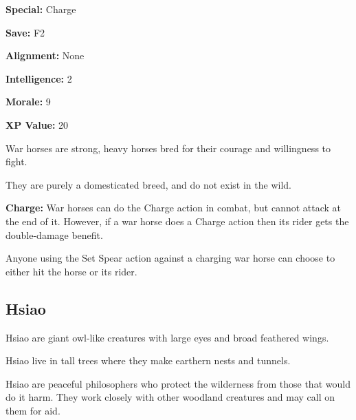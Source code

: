 \begin{multicols*}{2}
{\textbf{Special:} Charge

\textbf{Save:} F2

\textbf{Alignment:} None

\textbf{Intelligence:} 2

\textbf{Morale:} 9

\textbf{XP Value:} 20}

War horses are strong, heavy horses bred for their courage and willingness to fight.

They are purely a domesticated breed, and do not exist in the wild.

\textbf{Charge:} War horses can do the Charge action in combat, but cannot attack at the end of it. However, if a war horse does a Charge action then its rider gets the double-damage benefit.

Anyone using the Set Spear action against a charging war horse can choose to either hit the horse or its rider.

\subsection{Hsiao}

Hsiao are giant owl-like creatures with large eyes and broad feathered wings.

Hsiao live in tall trees where they make earthern nests and tunnels.

Hsiao are peaceful philosophers who protect the wilderness from those that would do it harm. They work closely with other woodland creatures and may call on them for aid.


\end{multicols*}
